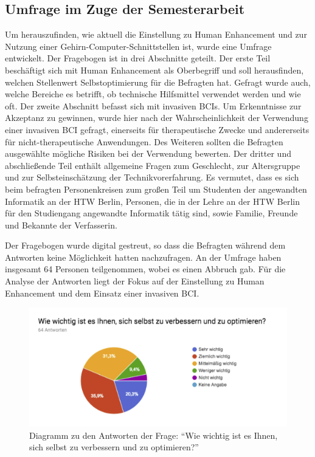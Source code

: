 \documentclass[11pt,ngerman,parskip=half]{scrartcl}
\begin{document}
\subsection{Umfrage im Zuge der Semesterarbeit}
\label{subsec:kathrin_umfrage_im_zuge_der_semesterarbeit}
Um herauszufinden, wie aktuell die Einstellung zu Human Enhancement und zur
Nutzung einer Gehirn-Computer-Schnittstellen ist, wurde eine Umfrage
entwickelt. Der Fragebogen ist in drei Abschnitte geteilt. Der erste Teil
beschäftigt sich mit Human Enhancement als Oberbegriff und soll herausfinden,
welchen Stellenwert Selbstoptimierung für die Befragten hat. Gefragt wurde
auch, welche Bereiche es betrifft, ob technische Hilfsmittel verwendet werden
und wie oft. Der zweite Abschnitt befasst sich mit invasiven BCIs. Um
Erkenntnisse zur Akzeptanz zu gewinnen, wurde hier nach der
Wahrscheinlichkeit der Verwendung einer invasiven BCI gefragt, einerseits für
therapeutische Zwecke und andererseits für nicht-therapeutische Anwendungen.
Des Weiteren sollten die Befragten ausgewählte mögliche Risiken bei der
Verwendung bewerten. Der dritter und abschließende Teil enthält allgemeine
Fragen zum Geschlecht, zur Altersgruppe und zur Selbsteinschätzung der
Technikvorerfahrung. Es vermutet, dass es sich beim befragten Personenkreisen
zum großen Teil um Studenten der angewandten Informatik an der HTW Berlin,
Personen, die in der Lehre an der HTW Berlin für den Studiengang angewandte
Informatik tätig sind, sowie Familie, Freunde und Bekannte der Verfasserin.

Der Fragebogen wurde digital gestreut, so dass die Befragten während dem
Antworten keine Möglichkeit hatten nachzufragen. An der Umfrage haben
insgesamt 64 Personen teilgenommen, wobei es einen Abbruch gab. Für die
Analyse der Antworten liegt der Fokus auf der Einstellung zu Human
Enhancement und dem Einsatz einer invasiven BCI.

\begin{figure}[H]
  \centering
  \includegraphics[width=1.0\textwidth]{src/img/kathrin1.png}
  \caption{Diagramm zu den Antworten der Frage: \enquote{Wie wichtig ist es
  Ihnen, sich selbst zu verbessern und zu optimieren?}}
  \label{img:kathrin1}
\end{figure}
\end{document}
